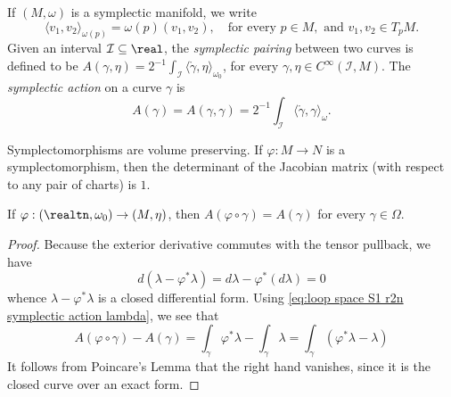 \documentclass[../main-v2-manifolds.tex]{subfiles}
\begin{document}
\begin{definition}
    If $(M,\omega)$ is a symplectic manifold, we write
    \[
        \langle v_{1}, v_{2}\rangle_{\omega(p)} = \omega(p)(v_1, v_2),\quad\text{for every }p\in M,\text{ and } v_{1},v_2\in T_pM.
    \]
    Given an interval $\mathcal{I}\subseteq\real$, the \emph{symplectic pairing} between two curves is defined to be $A(\gamma,\eta) = 2^{-1}\int_{\mathcal{I}} \langle \mathring{\gamma},\eta\rangle_{\omega_0}$, for every $\gamma,\eta\in C^\infty(\mathcal{I}, M)$. The \emph{symplectic action} on a curve $\gamma$ is 
    \[
        A(\gamma) = A(\gamma,\gamma) =2^{-1}\int_{\mathcal{I}}\langle\mathring{\gamma},\gamma\rangle_{\omega}.
    \]
\end{definition}
%
%
%
\begin{remark}
    Symplectomorphisms are volume preserving. If $\varphi:M\to N$ is a symplectomorphism, then the determinant of the Jacobian matrix (with respect to any pair of charts) is $1$.
\end{remark}
%
\begin{lemma}\label{lem:symplectomorphisms from realtn preserve symplectic action}
    If $\varphi:(\realtn,\omega_0)\to (M,\eta)$, then $A(\varphi\circ\gamma) = A(\gamma)$ for every $\gamma\in \Omega$.
\end{lemma}
\begin{proof}
    Because the exterior derivative commutes with the tensor pullback, we have
    \[
        d(\lambda - \varphi^*\lambda) = d\lambda - \varphi^*(d\lambda)= 0
    \]
    whence $\lambda - \varphi^*\lambda$ is a closed differential form. Using \cref{eq:loop space S1 r2n symplectic action lambda}, we see that
    \[
        A(\varphi\circ\gamma) - A(\gamma) = \int_{\gamma}\varphi^*\lambda - \int_{\gamma}\lambda = \int_{\gamma}(\varphi^*\lambda - \lambda)
    \]
    It follows from Poincare's Lemma that the right hand vanishes, since it is the closed curve over an exact form.
\end{proof}
\end{document}
